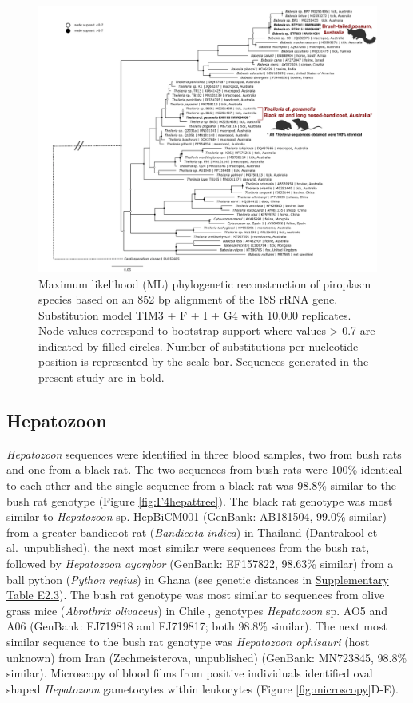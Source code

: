\documentclass[a4paper, nobind]{templates/ociamthesis}
\begin{document}
\begin{figure}
\includegraphics[width=0.95\linewidth]{figures/ms-figs/Ch4-pirotree} \caption[Phylogeny of piroplasm species.]{Maximum likelihood (ML) phylogenetic reconstruction of piroplasm species based on an 852 bp alignment of the 18S rRNA gene. Substitution model TIM3 + F + I + G4 with 10,000 replicates. Node values correspond to bootstrap support where values > 0.7 are indicated by filled circles. Number of substitutions per nucleotide position is represented by the scale-bar. Sequences generated in the present study are in bold.}\label{fig:F4pirotree}
\end{figure}

\hypertarget{hepatozoon}{%
\subsection{Hepatozoon}\label{hepatozoon}}

\emph{Hepatozoon} sequences were identified in three blood samples, two from bush rats and one from a black rat.
The two sequences from bush rats were 100\% identical to each other and the single sequence from a black rat was 98.8\% similar to the bush rat genotype (Figure \ref{fig:F4hepattree}).
The black rat genotype was most similar to \emph{Hepatozoon} sp. HepBiCM001 (GenBank: AB181504, 99.0\% similar) from a greater bandicoot rat (\emph{Bandicota indica}) in Thailand (Dantrakool et al.~unpublished), the next most similar were sequences from the bush rat, followed by \emph{Hepatozoon ayorgbor} (GenBank: EF157822, 98.63\% similar) from a ball python (\emph{Python regius}) in Ghana \autocite{slobodaNEWSPECIESHEPATOZOON2007} (see genetic distances in \protect\hyperlink{supplementary-table-e2.3}{Supplementary Table E2.3}).
The bush rat genotype was most similar to sequences from olive grass mice (\emph{Abrothrix olivaceus}) in Chile \autocite{merinoMolecularCharacterizationAncient2009}, genotypes \emph{Hepatozoon} sp. AO5 and A06 (GenBank: FJ719818 and FJ719817; both 98.8\% similar).
The next most similar sequence to the bush rat genotype was \emph{Hepatozoon ophisauri} (host unknown) from Iran (Zechmeisterova, unpublished) (GenBank: MN723845, 98.8\% similar).
Microscopy of blood films from positive individuals identified oval shaped \emph{Hepatozoon} gametocytes within leukocytes (Figure \ref{fig:microscopy}D-E).
\end{document}
